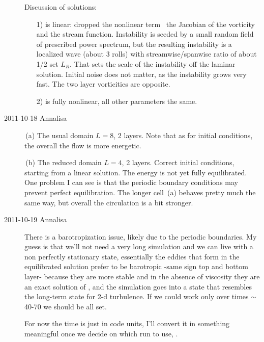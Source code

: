 \begin{description}
Discussion of solutions:
\begin{enumerate}
  \item [1)]
is linear: dropped the nonlinear term \ie\ the Jacobian of the vorticity
and the stream function. Instability is seeded by a small random field of
prescribed power spectrum, but the resulting instability is a localized
wave (about 3 rolls) with streamwise/spanwise ratio of about 1/2 set
$L_R$. That sets the scale of the instability off the laminar solution.
Initial noise does not matter, as the instability grows very fast. The
two layer vorticities are opposite.

  \item [2)] is fully nonlinear, all other parameters the same.

\end{enumerate}

\item[2011-10-18 Annalisa]

\,(a)
The usual domain $L=8$, 2 layers. Note that as for initial conditions,
the overall the flow is more energetic.

\,(b)
The reduced domain $L=4$, 2 layers. Correct initial conditions, starting
from a linear solution. The energy is not yet fully equilibrated. One
problem I can see is that the periodic boundary conditions may prevent
perfect equilibration. The longer cell \,(a) behaves
pretty much the same way, but overall the circulation is a bit stronger.

\item[2011-10-19 Annalisa]
There is a barotropization issue, likely due to the periodic boundaries.
My guess is that we'll not need a very long simulation and we can live
with a non perfectly stationary state, essentially the eddies that form
in the equilibrated solution prefer to be barotropic -same sign top and
bottom layer- because they are more stable and in the absence of
viscosity they are an exact solution of \NS, and the simulation goes
into a state that resembles the long-term state for 2-d turbulence. If we
could work only over times $\sim $40-70 we should be all set.

For now the time is just in code units, I'll convert it in something
meaningful once we decide on which run to use, \etc.


\end{description}
